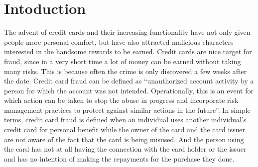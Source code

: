 \documentclass{report}
\begin{document}
\chapter{Intoduction} %








The advent of credit cards and their increasing functionality have not only given people more personal comfort, but have also attracted malicious characters interested in the handsome rewards to be earned. Credit cards are nice target for fraud, since in a very short time a lot of money can be earned without taking many risks. This is because often the crime is only discovered a few weeks after the date. Credit card fraud can be defined as “unauthorized account activity by a person for which the account was not intended. Operationally, this is an event for which action can be taken to stop the abuse in progress and incorporate risk management practices to protect against similar actions in the future”. In simple terms, credit card fraud is defined when an individual uses another individual’s credit card for personal benefit while the owner of the card and the card issuer are not aware of the fact that the card is being misused. And the person using the card has not at all having the connection with the card holder or the issuer and has no intention of making the repayments for the purchase they done. 


\end{document}
